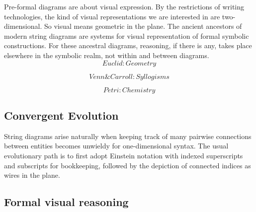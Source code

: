 Pre-formal diagrams are about visual expression. By the restrictions of writing technologies, the kind of visual representations we are interested in are two-dimensional. So visual means geometric in the plane. The ancient ancestors of modern string diagrams are systems for visual representation of formal symbolic constructions. For these ancestral diagrams, reasoning, if there is any, takes place elsewhere in the symbolic realm, not within and between diagrams.\\

\[Euclid: Geometry\]

\[Venn \& Carroll: Syllogisms\]

\[Petri: Chemistry\]

\subsection{Convergent Evolution}

String diagrams arise naturally when keeping track of many pairwise connections between entities becomes unwieldy for one-dimensional syntax. The usual evolutionary path is to first adopt Einstein notation with indexed superscripts and subscripts for bookkeeping, followed by the depiction of connected indices as wires in the plane.




\subsection{Formal visual reasoning}

